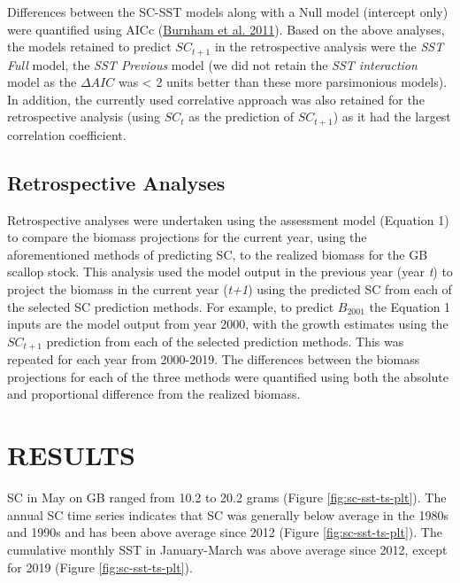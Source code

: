 \documentclass[
]{article}
\begin{document}
Differences between the SC-SST models along with a Null model (intercept only) were quantified using AICc (\protect\hyperlink{ref-burnhamAICModelSelection2011}{Burnham et al. 2011}). Based on the above analyses, the models retained to predict \(SC_{t+1}\) in the retrospective analysis were the \emph{SST Full} model, the \emph{SST Previous} model (we did not retain the \emph{SST interaction} model as the \(\Delta AIC\) was \textless{} 2 units better than these more parsimonious models). In addition, the currently used correlative approach was also retained for the retrospective analysis (using \(SC_t\) as the prediction of \(SC_{t+1}\)) as it had the largest correlation coefficient.

\hypertarget{retrospective-analyses}{%
\subsection{Retrospective Analyses}\label{retrospective-analyses}}

Retrospective analyses were undertaken using the assessment model (Equation 1) to compare the biomass projections for the current year, using the aforementioned methods of predicting SC, to the realized biomass for the GB scallop stock. This analysis used the model output in the previous year (year \emph{t}) to project the biomass in the current year (\emph{t+1}) using the predicted SC from each of the selected SC prediction methods. For example, to predict \(B_{2001}\) the Equation 1 inputs are the model output from year 2000, with the growth estimates using the \(SC_{t+1}\) prediction from each of the selected prediction methods. This was repeated for each year from 2000-2019. The differences between the biomass projections for each of the three methods were quantified using both the absolute and proportional difference from the realized biomass.

\hypertarget{ref-results}{%
\section{RESULTS}\label{ref-results}}

SC in May on GB ranged from 10.2 to 20.2 grams (Figure \ref{fig:sc-sst-ts-plt}). The annual SC time series indicates that SC was generally below average in the 1980s and 1990s and has been above average since 2012 (Figure \ref{fig:sc-sst-ts-plt}). The cumulative monthly SST in January-March was above average since 2012, except for 2019 (Figure \ref{fig:sc-sst-ts-plt}).
\end{document}
